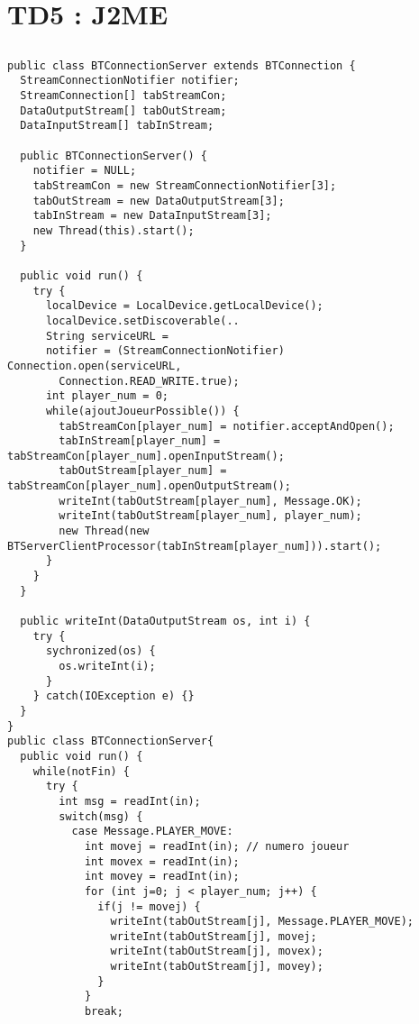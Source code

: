 \chapter{TD5 : J2ME}

\section{}
\break
\section{}
\break
\section{}
\begin{lstlisting}
public class BTConnectionServer extends BTConnection {
  StreamConnectionNotifier notifier;
  StreamConnection[] tabStreamCon;
  DataOutputStream[] tabOutStream;
  DataInputStream[] tabInStream;

  public BTConnectionServer() {
    notifier = NULL;
    tabStreamCon = new StreamConnectionNotifier[3];
    tabOutStream = new DataOutputStream[3];
    tabInStream = new DataInputStream[3];
    new Thread(this).start();
  }

  public void run() {
    try {
      localDevice = LocalDevice.getLocalDevice();
      localDevice.setDiscoverable(..
      String serviceURL = 
      notifier = (StreamConnectionNotifier) Connection.open(serviceURL,
        Connection.READ_WRITE.true);
      int player_num = 0;
      while(ajoutJoueurPossible()) {
        tabStreamCon[player_num] = notifier.acceptAndOpen();
        tabInStream[player_num] = tabStreamCon[player_num].openInputStream();
        tabOutStream[player_num] = tabStreamCon[player_num].openOutputStream();
        writeInt(tabOutStream[player_num], Message.OK);
        writeInt(tabOutStream[player_num], player_num);
        new Thread(new BTServerClientProcessor(tabInStream[player_num])).start();
      }
    }
  }

  public writeInt(DataOutputStream os, int i) {
    try {
      sychronized(os) {
        os.writeInt(i);
      }
    } catch(IOException e) {}
  }
}
public class BTConnectionServer{
  public void run() {
    while(notFin) {
      try {
        int msg = readInt(in);
        switch(msg) {
          case Message.PLAYER_MOVE:
            int movej = readInt(in); // numero joueur
            int movex = readInt(in);
            int movey = readInt(in);
            for (int j=0; j < player_num; j++) {
              if(j != movej) {
                writeInt(tabOutStream[j], Message.PLAYER_MOVE);
                writeInt(tabOutStream[j], movej;
                writeInt(tabOutStream[j], movex);
                writeInt(tabOutStream[j], movey);
              }
            }
            break;
\end{lstlisting}

